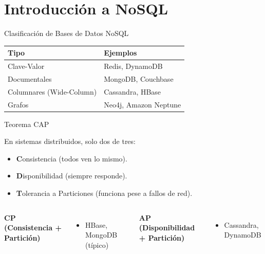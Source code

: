 \documentclass[aspectratio=169, 10pt, xcolor=table]{beamer}
\begin{document}
\section{Introducción a NoSQL}

\begin{frame}{Clasificación de Bases de Datos NoSQL}
    \begin{table}
        \centering
        \begin{tabular}{l|l}
            \toprule
            Tipo & Ejemplos \\
            \midrule
            Clave-Valor & Redis, DynamoDB \\
            Documentales & MongoDB, Couchbase \\
            Columnares (Wide-Column) & Cassandra, HBase \\
            Grafos & Neo4j, Amazon Neptune \\
            \bottomrule
        \end{tabular}
    \end{table}
\end{frame}

\begin{frame}{Teorema CAP}
    \begin{block}{En sistemas distribuidos, solo dos de tres:}
        \begin{itemize}
            \item \textbf{C}onsistencia (todos ven lo mismo).
            \item \textbf{D}isponibilidad (siempre responde).
            \item \textbf{T}olerancia a Particiones (funciona pese a fallos de red).
        \end{itemize}
    \end{block}
    \begin{columns}[t]
        \textbf{CP (Consistencia + Partición)}
        \begin{itemize}
            \item HBase, MongoDB (típico)
        \end{itemize}
        \textbf{AP (Disponibilidad + Partición)}
        \begin{itemize}
            \item Cassandra, DynamoDB
        \end{itemize}
    \end{columns}
\end{frame}
\end{document}

